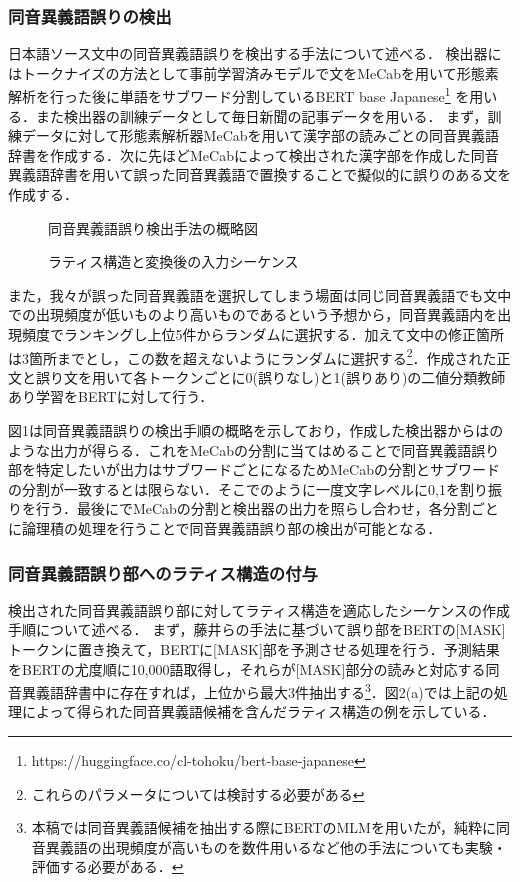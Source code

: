\documentclass[a4j,10pt, twocolumn]{jarticle} \usepackage[dvipdfmx]{graphicx} \usepackage{amssymb} \usepackage{amsmath}
\begin{document}
\subsubsection{同音異義語誤りの検出}
日本語ソース文中の同音異義語誤りを検出する手法について述べる．
検出器にはトークナイズの方法として事前学習済みモデルで文をMeCabを用いて形態素解析を行った後に単語をサブワード分割しているBERT base Japanese\footnote{https://huggingface.co/cl-tohoku/bert-base-japanese}
を用いる．また検出器の訓練データとして毎日新聞の記事データを用いる．
まず，訓練データに対して形態素解析器MeCabを用いて漢字部の読みごとの同音異義語辞書を作成する．次に先ほどMeCabによって検出された漢字部を作成した同音異義語辞書を用いて誤った同音異義語で置換することで擬似的に誤りのある文を作成する．

\begin{figure}[h]
   \centering
    
    \caption{同音異義語誤り検出手法の概略図}
\end{figure}

\begin{figure}[h]
   \centering
    
    \caption{ラティス構造と変換後の入力シーケンス}
\end{figure}

また，我々が誤った同音異義語を選択してしまう場面は同じ同音異義語でも文中での出現頻度が低いものより高いものであるという予想から，同音異義語内を出現頻度でランキングし上位5件からランダムに選択する．加えて文中の修正箇所は3箇所までとし，この数を超えないようにランダムに選択する\footnote{これらのパラメータについては検討する必要がある}．作成された正文と誤り文を用いて各トークンごとに0(誤りなし)と1(誤りあり)の二値分類教師あり学習をBERTに対して行う．

図1は同音異義語誤りの検出手順の概略を示しており，作成した検出器からはのような出力が得らる．これをMeCabの分割に当てはめることで同音異義語誤り部を特定したいが出力はサブワードごとになるためMeCabの分割とサブワードの分割が一致するとは限らない．そこでのように一度文字レベルに0,1を割り振りを行う．最後にでMeCabの分割と検出器の出力を照らし合わせ，各分割ごとに論理積の処理を行うことで同音異義語誤り部の検出が可能となる．

\subsubsection{同音異義語誤り部へのラティス構造の付与}
検出された同音異義語誤り部に対してラティス構造を適応したシーケンスの作成手順について述べる．
まず，藤井らの手法に基づいて誤り部をBERTの[MASK]トークンに置き換えて，BERTに[MASK]部を予測させる処理を行う．予測結果をBERTの尤度順に10,000語取得し，それらが[MASK]部分の読みと対応する同音異義語辞書中に存在すれば，上位から最大3件抽出する\footnote{本稿では同音異義語候補を抽出する際にBERTのMLMを用いたが，純粋に同音異義語の出現頻度が高いものを数件用いるなど他の手法についても実験・評価する必要がある．}．図2(a)では上記の処理によって得られた同音異義語候補を含んだラティス構造の例を示している．
\end{document}
